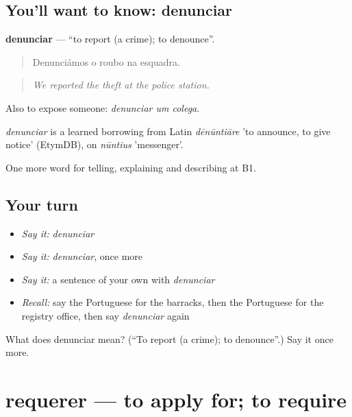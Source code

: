\subsection*{You'll want to know: denunciar}
\textbf{denunciar} — \textquotedblleft{}to report (a crime); to denounce\textquotedblright{}.

\begin{quote}
Denunciámos o roubo na esquadra.
\end{quote}

\begin{quote}
\emph{We reported the theft at the police station.}
\end{quote}

Also to expose someone: \emph{denunciar um colega}.

\begin{cousinweb}
\emph{denunciar} is a learned borrowing from Latin \emph{dēnūntiāre} 'to announce, to give notice' (EtymDB), on \emph{nūntius} 'messenger'.
\end{cousinweb}

\begin{grammarlens}[title={What you've built}]
One more word for telling, explaining and describing at B1.
\end{grammarlens}

\subsection*{Your turn}
\begin{itemize}
\raggedright
  \item \emph{Say it:} \emph{denunciar}
  \item \emph{Say it:} \emph{denunciar}, once more
  \item \emph{Say it:} a sentence of your own with \emph{denunciar}
  \item \emph{Recall:} say the Portuguese for the barracks, then the Portuguese for the registry office, then say \emph{denunciar} again
\end{itemize}

\begin{tcolorbox}[breakable,colback=teal!4,colframe=teal!35!black,title={Before you move on}]
What does denunciar mean? (\textquotedblleft{}To report (a crime); to denounce\textquotedblright{}.) Say it once more.
\end{tcolorbox}
\section[requerer]{requerer — to apply for; to require}

